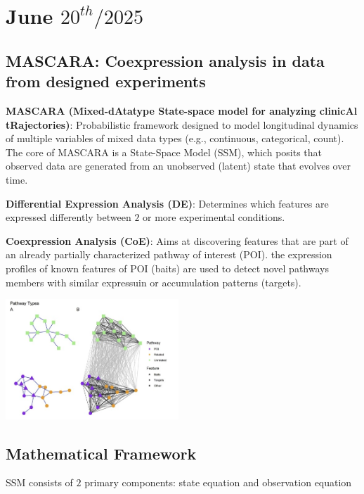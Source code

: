 \documentclass[../main.tex]{subfiles}
\begin{document}
\chapter{June $20^{th} / 2025$}
\label{ch:tufte-design}

\section{MASCARA: Coexpression analysis in data from designed experiments}\cite{WHITE2025100052}

\hrulefill

\textbf{MASCARA (Mixed-dAtatype State-space model for analyzing clinicAl tRajectories)}: Probabilistic framework designed to model longitudinal dynamics of multiple variables of mixed data types (e.g., continuous, categorical, count). The core of MASCARA is a State-Space Model (SSM), which posits that observed data are generated from an unobserved (latent) state that evolves over time.

\vspace{0.3cm}

\textbf{Differential Expression Analysis (DE)}: Determines which features are expressed differently between $2$ or more experimental conditions.

\vspace{0.3cm}

\textbf{Coexpression Analysis (CoE)}: Aims at discovering features that are part of an already partially characterized pathway of interest (POI). the expression profiles of known features of POI (baits) are used to detect novel pathways members with similar expressuin or accumulation patterns (targets).

\begin{center}
    \includegraphics[width=6.5cm]{files/images/pathwy_types.png}
\end{center}

\section{Mathematical Framework}
SSM consists of $2$ primary components: state equation and observation equation
\end{document}
